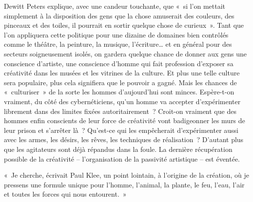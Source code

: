 \documentclass[french,twoside]{book} %
\newenvironment{quoteblock}%
  {\begin{quoting}}
  {\end{quoting}}
\newenvironment{quotebar}{%
    \def\FrameCommand{{\color{rubric!10!}\vrule width 0.5em} \hspace{0.9em}}%
    \def\OuterFrameSep{\itemsep} %
    \MakeFramed {\advance\hsize-\width \FrameRestore}
  }%
  {%
    \endMakeFramed
  }
\renewenvironment{quoteblock}%
  {%
    \savenotes
    \setstretch{0.9}
    \normalfont
    \begin{quotebar}
  }
  {%
    \end{quotebar}
    \spewnotes
  }
\begin{document}
Dewitt Peters explique, avec une candeur touchante, que « si l’on mettait simplement à la disposition des gens que la chose amuserait des couleurs, des pinceaux et des toiles, il pourrait en sortir quelque chose de curieux ». Tant que l’on appliquera cette politique pour une dizaine de domaines bien contrôlés comme le théâtre, la peinture, la musique, l’écriture… et en général pour des secteurs soigneusement isolés, on gardera quelque chance de donner aux gens une conscience d’artiste, une conscience d’homme qui fait profession d’exposer sa créativité dans les musées et les vitrines de la culture. Et plus une telle culture sera populaire, plus cela signifiera que le pouvoir a gagné. Mais les chances de « culturiser » de la sorte les hommes d’aujourd’hui sont minces. Espère-t-on vraiment, du côté des cybernéticiens, qu’un homme va accepter d’expérimenter librement dans des limites fixées autoritairement ? Croit-on vraiment que des hommes enfin conscients de leur force de créativité vont badigeonner les murs de leur prison et s’arrêter là ? Qu’est-ce qui les empêcherait d’expérimenter aussi avec les armes, les désirs, les rêves, les techniques de réalisation ? D’autant plus que les agitateurs sont déjà répandus dans la foule. La dernière récupération possible de la créativité – l’organisation de la passivité artistique – est éventée.\par

\begin{quoteblock}
\noindent « Je cherche, écrivait Paul Klee, un point lointain, à l’origine de la création, où je pressens une formule unique pour l’homme, l’animal, la plante, le feu, l’eau, l’air et toutes les forces qui nous entourent. »\end{quoteblock}
\end{document}
